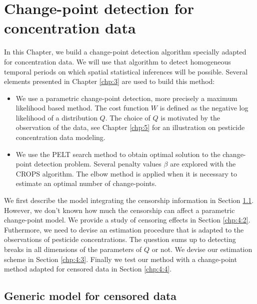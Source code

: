 \chapter{Change-point detection for concentration data}\label{chp:4}

\minitoc

\clearpage

In this Chapter, we build a change-point detection algorithm specially adapted for concentration data. We will use that algorithm to detect homogeneous temporal periods on which spatial statistical inferences will be possible. Several elements presented in Chapter \ref{chp:3} are used to build this method:  
\begin{itemize}
\item We use a parametric change-point detection, more precisely a maximum likelihood based method. The cost function $W$ is defined as the negative log likelihood of a distribution $Q$. The choice of $Q$ is motivated by the observation of the data, see Chapter \ref{chp:5} for an illustration on pesticide concentration data modeling.  
\item We use the PELT search method to obtain optimal solution to the change-point detection problem. Several penalty values $\beta$ are explored with the CROPS algorithm. The elbow method is applied when it is necessary to estimate an optimal number of change-points.   
\end{itemize}
We first describe the model integrating the censorship information in Section \ref{chp:4:1}. However, we don't known how much the censorship can affect a parametric change-point model. We provide a study of censoring effects in Section \ref{chp:4:2}. Futhermore, we need to devise an estimation procedure that is adapted to the observations of pesticide concentrations. The question sums up to detecting breaks in all dimensions of the parameters of $Q$ or not. We devise our estimation scheme in Section \ref{chp:4:3}. Finally we test our method with a change-point method adapted for censored data in Section \ref{chp:4:4}.  


\section{Generic model for censored data}\label{chp:4:1}

